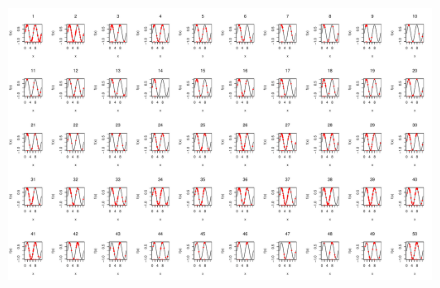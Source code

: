 \documentclass{article}
\begin{document}
\begin{figure}
\centering
\includegraphics[width=1.0\textwidth]{gaSearchingR.pdf}
\end{figure}

\clearpage
\end{document}
